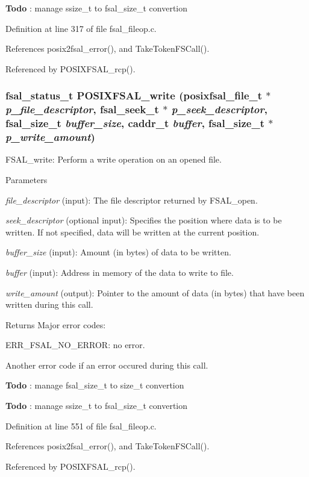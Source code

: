 \begin{Desc}
\item[{\bf Todo}]: manage ssize\_\-t to fsal\_\-size\_\-t convertion \end{Desc}


Definition at line 317 of file fsal\_\-fileop.c.

References posix2fsal\_\-error(), and TakeTokenFSCall().

Referenced by POSIXFSAL\_\-rcp().
\subsubsection[{POSIXFSAL\_\-write}]{\setlength{\rightskip}{0pt plus 5cm}fsal\_\-status\_\-t POSIXFSAL\_\-write (posixfsal\_\-file\_\-t $\ast$ {\em p\_\-file\_\-descriptor}, \/  fsal\_\-seek\_\-t $\ast$ {\em p\_\-seek\_\-descriptor}, \/  fsal\_\-size\_\-t {\em buffer\_\-size}, \/  caddr\_\-t {\em buffer}, \/  fsal\_\-size\_\-t $\ast$ {\em p\_\-write\_\-amount})}\label{fsal__fileop_8c_a0324573c407577df6db8311c8ccba321}
FSAL\_\-write: Perform a write operation on an opened file.


\begin{DoxyParams}{Parameters}
\item[{\em file\_\-descriptor}](input): The file descriptor returned by FSAL\_\-open. \item[{\em seek\_\-descriptor}](optional input): Specifies the position where data is to be written. If not specified, data will be written at the current position. \item[{\em buffer\_\-size}](input): Amount (in bytes) of data to be written. \item[{\em buffer}](input): Address in memory of the data to write to file. \item[{\em write\_\-amount}](output): Pointer to the amount of data (in bytes) that have been written during this call.\end{DoxyParams}
\begin{DoxyReturn}{Returns}
Major error codes:
\begin{DoxyItemize}
\item ERR\_\-FSAL\_\-NO\_\-ERROR: no error.
\item Another error code if an error occured during this call. 
\end{DoxyItemize}
\end{DoxyReturn}


\begin{Desc}
\item[{\bf Todo}]: manage fsal\_\-size\_\-t to size\_\-t convertion \end{Desc}


\begin{Desc}
\item[{\bf Todo}]: manage ssize\_\-t to fsal\_\-size\_\-t convertion \end{Desc}


Definition at line 551 of file fsal\_\-fileop.c.

References posix2fsal\_\-error(), and TakeTokenFSCall().

Referenced by POSIXFSAL\_\-rcp().